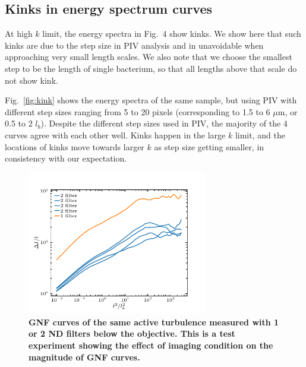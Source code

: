 \documentclass[preprint,aps,prl,amsmath,amssymb,longbibliography]{revtex4-2}
\begin{document}
\subsection{Kinks in energy spectrum curves}
At high $k$ limit, the energy spectra in Fig.~4 show kinks. We show here that such kinks are due to the step size in PIV analysis and in unavoidable when approaching very small length scales. We also note that we choose the smallest step to be the length of single bacterium, so that all lengths above that scale do not show kink.



Fig.~\ref{fig:kink} shows the energy spectra of the same sample, but using PIV with different step sizes ranging from 5 to 20 pixels (corresponding to 1.5 to 6 $\mu$m, or 0.5 to 2 $l_b$). Despite the different step sizes used in PIV, the majority of the 4 curves agree with each other well. Kinks happen in the large $k$ limit, and the locations of kinks move towards larger $k$ as step size getting smaller, in consistency with our expectation.

\begin{figure}[!]
\begin{center}
\includegraphics[width=0.7\textwidth]{Figures/GNF-normalization/different-filters.pdf}
\caption[Density autocorrelation]
{
\textbf{GNF curves of the same active turbulence measured with 1 or 2 ND filters below the objective. This is a test experiment showing the effect of imaging condition on the magnitude of GNF curves.}
}
\label{fig:filter-effect}
\end{center}
\end{figure}
\end{document}
